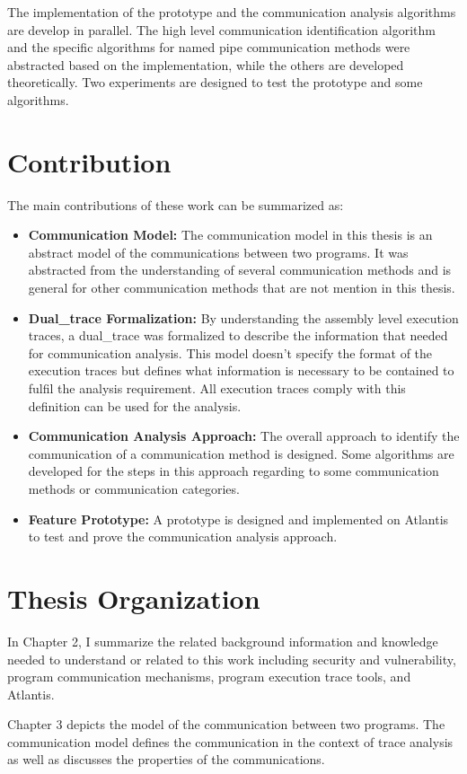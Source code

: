 The implementation of the prototype and the communication analysis algorithms are develop in parallel. The high level communication identification algorithm and the specific algorithms for named pipe communication methods were abstracted based on the implementation, while the others are developed theoretically. Two experiments are designed to test the prototype and some algorithms. 


\section{Contribution}
The main contributions of these work can be summarized as:
\begin{itemize}
  \item \textbf{Communication Model:} The communication model in this thesis is an abstract model of the communications between two programs. It was abstracted from the understanding of several communication methods and is general for other communication methods that are not mention in this thesis.
  \item \textbf{Dual\_trace Formalization:} By understanding the assembly level execution traces, a dual\_trace was formalized to describe the information that needed for communication analysis. This model doesn't specify the format of the execution traces but defines what information is necessary to be contained to fulfil the analysis requirement. All execution traces comply with this definition can be used for the analysis.
  \item \textbf{Communication Analysis Approach:} The overall approach to identify the communication of a communication method is designed. Some algorithms are developed for the steps in this approach regarding to some communication methods or communication categories.
  \item \textbf{Feature Prototype:} A prototype is designed and implemented on Atlantis to test and prove the communication analysis approach.
\end{itemize}

\section{Thesis Organization}
In Chapter 2, I summarize the related background information and knowledge needed to understand or related to this work including security and vulnerability, program communication mechanisms, program execution trace tools, and Atlantis. 

Chapter 3 depicts the model of the communication between two programs. The communication model defines the communication in the context of trace analysis as well as discusses the properties of the communications. 

